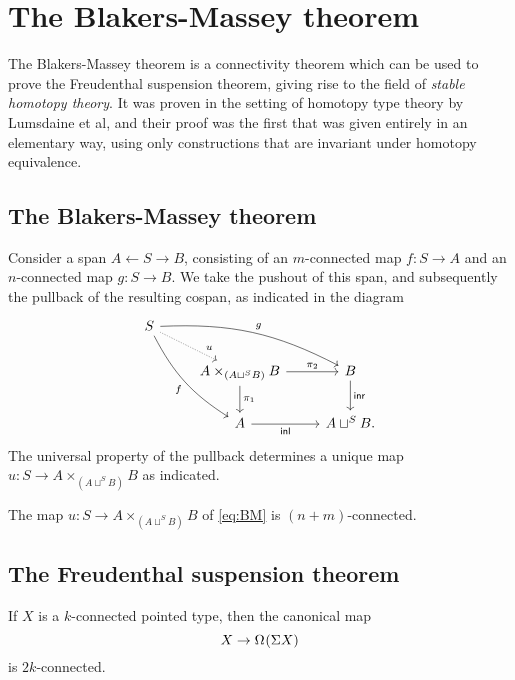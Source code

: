 
\section{The Blakers-Massey theorem}
The Blakers-Massey theorem is a connectivity theorem which can be used to prove the Freudenthal suspension theorem, giving rise to the field of \emph{stable homotopy theory}. It was proven in the setting of homotopy type theory by Lumsdaine et al, and their proof was the first that was given entirely in an elementary way, using only constructions that are invariant under homotopy equivalence. 

\subsection{The Blakers-Massey theorem}
Consider a span $A \leftarrow S \rightarrow B$, consisting of an $m$-connected map $f:S\to A$ and an $n$-connected map $g:S\to B$. We take the pushout of this span, and subsequently the pullback of the resulting cospan, as indicated in the diagram
\begin{equation}\label{eq:BM}
\begin{tikzcd}
S \arrow[drr,bend left=15,"g"] \arrow[ddr,bend right=15,swap,"f"] \arrow[dr,densely dotted,"u" near end] \\
& A \times_{(A \sqcup^S B)} B \arrow[r,"\pi_2"] \arrow[d,"\pi_1"] & B \arrow[d,"\inr"] \\
& A \arrow[r,swap,"\inl"] & A \sqcup^S B.
\end{tikzcd}
\end{equation}
The universal property of the pullback determines a unique map $u:S\to A \times_{(A\sqcup^S B)} B$ as indicated.

\begin{thm}
The map $u:S\to A \times_{(A\sqcup^S B)} B$ of \cref{eq:BM} is $(n+m)$-connected.
\end{thm}

\subsection{The Freudenthal suspension theorem}

\begin{thm}
  If $X$ is a $k$-connected pointed type, then the canonical map
  \begin{equation*}
    X \to \Omega^{}(\Sigma{X})
  \end{equation*}
  is $2k$-connected.
\end{thm}

